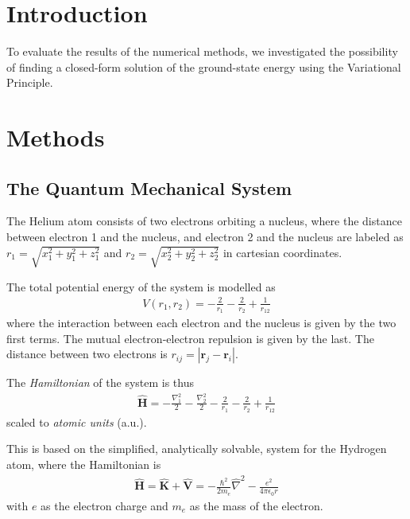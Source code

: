 \documentclass[twocolumns, a4paper,11pt,fleqn]{extarticle}
\title{}
\newcommand{\eq}[1]{{\small\begin{align*}#1\end{align*}}}
\renewcommand\vec[1]{\boldsymbol{\mathbf{#1}}}
\newcommand{\OP}[1]{\mathbf{\widehat{#1}}}
\newcommand{\op}[1]{\hat{#1}}
\begin{document}

\section{Introduction}

To evaluate the results of the numerical methods, we investigated the possibility
of finding a closed-form solution of the ground-state energy 
using the Variational Principle.

\section{Methods}
\subsection{The Quantum Mechanical System}
The Helium atom consists of two electrons orbiting a nucleus,
where the distance between electron 1 and the nucleus,
and electron 2 and the nucleus are labeled as
$r_1 = \sqrt{x_1^2 + y_1^2 + z_1^2}$ 
and $r_2 = \sqrt{x_2^2 + y_2^2 + z_2^2}$ in cartesian coordinates.

The total potential energy of the system is modelled as
{\small
\eq{
    V(r_1,r_2)=-\frac{2}{r_1}-\frac{2}{r_2}+\frac{1}{r_{12}}
}}%
where the interaction between each electron and the nucleus
is given by the two first terms. 
The mutual electron-electron repulsion is given by the last.
The distance between two electrons is $r_{ij}=|\vec r_j-\vec r_i|$.

The \textit{Hamiltonian} of the system is thus
\eq{
    \OP H = -\frac{\nabla_1 ^2}{2} -\frac{\nabla_2 ^2}{2}
    -\frac{2}{r_1}-\frac{2}{r_2}+\frac{1}{r_{12}}
}
scaled to \textit{atomic units} (a.u.).

This is based on the simplified, analytically solvable, system for the 
Hydrogen atom, where the Hamiltonian is
\eq{
  \OP H = \OP K + \OP V = -\frac{\hbar^2}{2m_e}\op \nabla^2 - \frac{e^2}{4\pi \epsilon_0 r}
}
with $e$ as the electron charge and $m_e$ as the mass of the electron.
\end{document}
